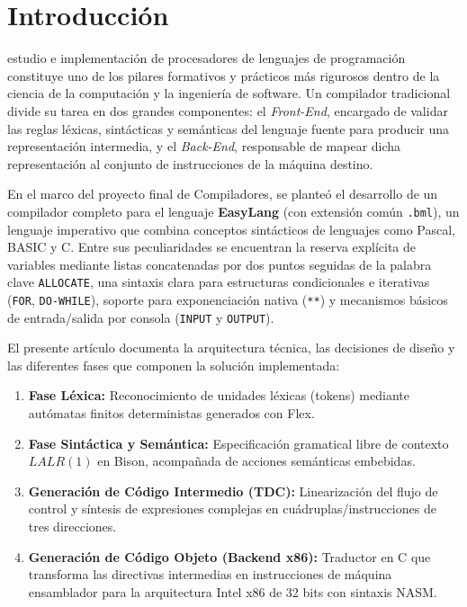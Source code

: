 \documentclass[conference]{IEEEtran}
\begin{document}
\section{Introducción}
 estudio e implementación de procesadores de lenguajes de programación constituye uno de los pilares formativos y prácticos más rigurosos dentro de la ciencia de la computación y la ingeniería de software. Un compilador tradicional divide su tarea en dos grandes componentes: el \textit{Front-End}, encargado de validar las reglas léxicas, sintácticas y semánticas del lenguaje fuente para producir una representación intermedia, y el \textit{Back-End}, responsable de mapear dicha representación al conjunto de instrucciones de la máquina destino.

En el marco del proyecto final de Compiladores, se planteó el desarrollo de un compilador completo para el lenguaje \textbf{EasyLang} (con extensión común \texttt{.bml}), un lenguaje imperativo que combina conceptos sintácticos de lenguajes como Pascal, BASIC y C. Entre sus peculiaridades se encuentran la reserva explícita de variables mediante listas concatenadas por dos puntos seguidas de la palabra clave \texttt{ALLOCATE}, una sintaxis clara para estructuras condicionales e iterativas (\texttt{FOR}, \texttt{DO-WHILE}), soporte para exponenciación nativa (\texttt{**}) y mecanismos básicos de entrada/salida por consola (\texttt{INPUT} y \texttt{OUTPUT}).

El presente artículo documenta la arquitectura técnica, las decisiones de diseño y las diferentes fases que componen la solución implementada:
\begin{enumerate}
    \item \textbf{Fase Léxica:} Reconocimiento de unidades léxicas (tokens) mediante autómatas finitos deterministas generados con Flex.
    \item \textbf{Fase Sintáctica y Semántica:} Especificación gramatical libre de contexto $LALR(1)$ en Bison, acompañada de acciones semánticas embebidas.
    \item \textbf{Generación de Código Intermedio (TDC):} Linearización del flujo de control y síntesis de expresiones complejas en cuádruplas/instrucciones de tres direcciones.
    \item \textbf{Generación de Código Objeto (Backend x86):} Traductor en C que transforma las directivas intermedias en instrucciones de máquina ensamblador para la arquitectura Intel x86 de 32 bits con sintaxis NASM.
\end{enumerate}
\end{document}
